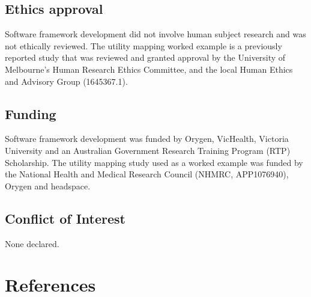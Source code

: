 \documentclass[
]{article}
\begin{document}
\hypertarget{ethics-approval}{%
\subsection*{Ethics approval}\label{ethics-approval}}

Software framework development did not involve human subject research and was not ethically reviewed. The utility mapping worked example is a previously reported study that was reviewed and granted approval by the University of Melbourne's Human Research Ethics Committee, and the local Human Ethics and Advisory Group (1645367.1).

\hypertarget{funding}{%
\subsection*{Funding}\label{funding}}

Software framework development was funded by Orygen, VicHealth, Victoria University and an Australian Government Research Training Program (RTP) Scholarship. The utility mapping study used as a worked example was funded by the National Health and Medical Research Council (NHMRC, APP1076940), Orygen and headspace.

\hypertarget{conflict-of-interest}{%
\subsection*{Conflict of Interest}\label{conflict-of-interest}}

None declared.

\newpage

\hypertarget{references}{%
\section*{References}\label{references}}
\end{document}

